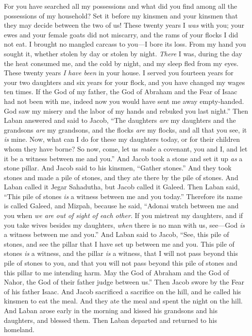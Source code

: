 \begin{biblechapter}
\verse For you have searched all my possessions and what did you find among all the possessions of my household? Set it before my kinsmen and your kinsmen that they may decide between the two of us!
\verse These twenty years I \textit{was} with you; your ewes and your female goats did not miscarry, and the rams of your flocks I did not eat.
\verse I brought no mangled carcass to you—I bore its loss. From my hand you sought it, whether stolen by day or stolen by night.
\verse \textit{There} I was, during the day the heat consumed me, and the cold by night, and my sleep fled from my eyes.
\verse These twenty years \textit{I have been} in your house. I served you fourteen years for your two daughters and six years for your flock, and you have changed my wages ten times.
\verse If the God of my father, the God of Abraham and the Fear of Isaac had not been with me, indeed now you would have sent me away empty-handed. God saw my misery and the labor of my hands and rebuked you last night.”
\verse Then Laban answered and said to Jacob, “The daughters \textit{are} my daughters and the grandsons \textit{are} my grandsons, and the flocks \textit{are} my flocks, and all that you see, it \textit{is} mine. Now, what can I do for these my daughters today, or for their children whom they have borne?
\verse So now, come, let us \textit{make} a covenant, you and I, and let it be a witness between me and you.”
\verse And Jacob took a stone and set it up \textit{as} a stone pillar.
\verse And Jacob said to his kinsmen, “Gather stones.” And they took stones and made a pile of stones, and they ate there by the pile of stones.
\verse And Laban called it Jegar Sahadutha, but Jacob called it Galeed.
\verse Then Laban said, “This pile of stones \textit{is} a witness between me and you today.” Therefore its name is called Galeed,
\verse and Mizpah, because he said, “Adonai watch between me and you when \textit{we are out of sight of each other}.
\verse If you mistreat my daughters, and if you take wives besides my daughters, \textit{when} there is no man with us, see—God \textit{is} a witness between me and you.”
\verse And Laban said to Jacob, “See, this pile of stones, and see the pillar that I have set up between me and you.
\verse This pile of stones \textit{is} a witness, and the pillar \textit{is} a witness, that I will not pass beyond this pile of stones to you, and that you will not pass beyond this pile of stones and this pillar to me intending harm.
\verse May the God of Abraham and the God of Nahor, the God of their father judge between us.” Then Jacob swore by the Fear of his father Isaac.
\verse And Jacob sacrificed a sacrifice on the hill, and he called his kinsmen to eat the meal. And they ate the meal and spent the night on the hill.
\verse  And Laban arose early in the morning and kissed his grandsons and his daughters, and blessed them. Then Laban departed and returned to his homeland.
\end{biblechapter}

